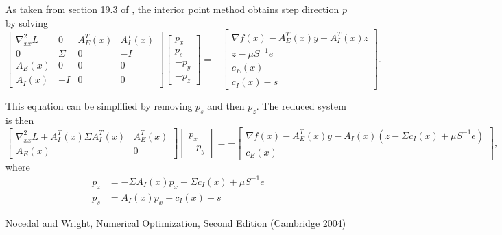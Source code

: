 \documentclass{article}
\begin{document}
As taken from section 19.3 of \cite{NW04}, 
    the interior point method obtains step direction $p$ by solving
\begin{equation}
\begin{bmatrix}
    \nabla^2_{xx}\mathit{L} & 0 & A_E^T(x) & A_I^T(x) \\
    0 & \Sigma & 0 & -I \\
    A_E(x) & 0 & 0 & 0 \\
    A_I(x) & -I & 0 & 0
\end{bmatrix}
\begin{bmatrix} p_x \\ p_s \\ -p_y \\ -p_z \end{bmatrix}
    = -
\begin{bmatrix}
    \nabla f(x) - A_E^T(x) y - A_I^T(x) z \\
    z - \mu S^{-1} e \\
    c_E(x) \\
    c_I(x) - s
\end{bmatrix}.
\end{equation}

This equation can be simplified by removing $p_s$ and then $p_z$.
The reduced system is then
\begin{equation}
\begin{bmatrix}
    \nabla^2_{xx}\mathit{L} + A_I^T(x) \Sigma A_I^T(x) & A_E^T(x) \\
    A_E(x) & 0 
\end{bmatrix}
\begin{bmatrix} p_x \\ -p_y \end{bmatrix}
    = -
\begin{bmatrix}
    \nabla f(x) - A_E^T(x) y - A_I(x) (z - \Sigma c_I(x) + \mu S^{-1} e) \\
    c_E(x)
\end{bmatrix},
\end{equation}
where
\begin{align}
    p_z &= -\Sigma A_I(x) p_x - \Sigma c_I(x) + \mu S^{-1} e \\
    p_s &= A_I(x) p_x + c_I(x) - s
\end{align}


\begin{thebibliography}{99}
 Nocedal and Wright, 
    Numerical Optimization, Second Edition (Cambridge 2004)
\end{thebibliography}
\end{document}
